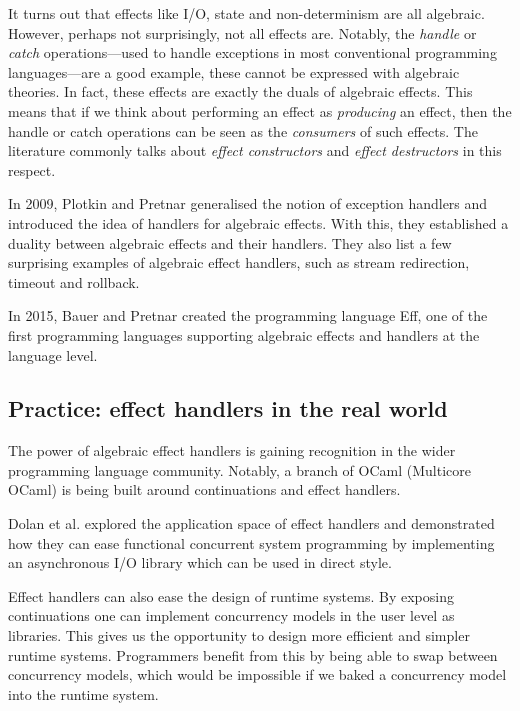 \documentclass[class=article,crop=false,11pt]{standalone}
\begin{document}
It turns out that effects like I/O, state and non-determinism are all algebraic.
However, perhaps not surprisingly, not all effects are. Notably, the
\emph{handle} or \emph{catch} operations---used to handle exceptions in
most conventional programming languages---are a good example, these cannot be
expressed with algebraic theories.
%
In fact, these effects are exactly the duals of algebraic effects. This means
that if we think about performing an effect as \emph{producing} an effect, then
the handle or catch operations can be seen as the \emph{consumers} of such
effects. The literature commonly talks about \emph{effect constructors} and
\emph{effect destructors} in this respect.

In 2009, Plotkin and Pretnar \cite{plotkin2009handlers} generalised the notion
of exception handlers and introduced the idea of handlers for algebraic effects.
With this, they established a duality between algebraic effects and their
handlers. They also list a few surprising examples of algebraic effect handlers,
such as stream redirection, timeout and rollback.

In 2015, Bauer and Pretnar \cite{bauer2015programming} created the programming
language Eff, one of the first programming languages supporting algebraic
effects and handlers at the language level.

\subsection{Practice: effect handlers in the real world}

The power of algebraic effect handlers is gaining recognition in the wider
programming language community. Notably, a branch of OCaml (Multicore OCaml)
is being built around continuations and effect handlers.

Dolan et al. \cite{dolan2017concurrent} explored the application space of
effect handlers and demonstrated how they can ease functional concurrent
system programming by implementing an asynchronous I/O library which can be
used in direct style.

Effect handlers can also ease the design of runtime systems. By exposing
continuations one can implement concurrency models in the user level as
libraries. This gives us the opportunity to design more efficient and simpler
runtime systems. Programmers benefit from this by being able to swap between
concurrency models, which would be impossible if we baked a concurrency model
into the runtime system.

\ifstandalone
{}

\fi
\end{document}
